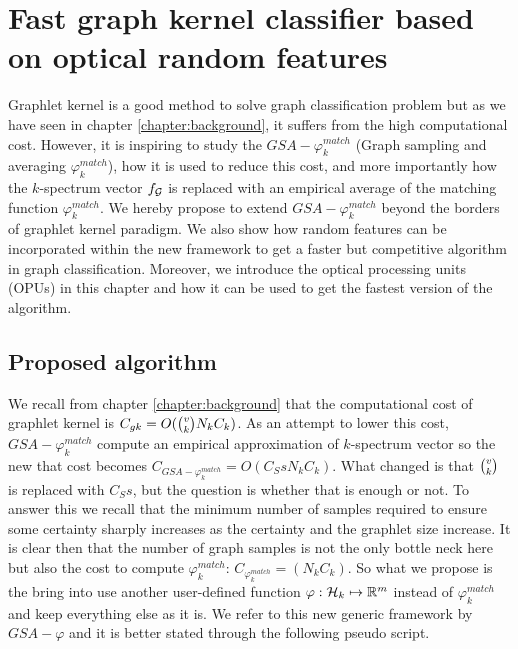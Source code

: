 \chapter{Fast graph kernel classifier based on optical random features }
\label{chapter:fast_algorithm}
Graphlet kernel  is a good method to solve graph classification problem but as we have seen in chapter \ref{chapter:background}, it suffers from the high computational cost. However, it is inspiring to study the $GSA-{\varphi_k^{match}}$ (Graph sampling and averaging $\varphi_k^{match}$), how it is used to reduce this cost, and more importantly how  the $k$-spectrum vector $f_{\mathcal{G}}$ is replaced with an empirical average of the matching function $\varphi_k^{match}$. We hereby propose to extend $GSA-{\varphi_k^{match}}$ beyond the borders of graphlet kernel paradigm. We also show how random features can be incorporated within the new framework to get a faster but  competitive algorithm in graph classification. Moreover, we introduce the optical processing units (OPUs) in this chapter and how it can be used to get the fastest version of the algorithm. 

\section{Proposed algorithm}
We recall from chapter \ref{chapter:background} that the computational cost of graphlet kernel is $C_{gk}= O(\tbinom{v}{k} N_k C_k)$. As an attempt to lower this cost, $GSA-\varphi_k^{match}$ compute an empirical approximation of $k$-spectrum vector so the new that cost becomes $C_{GSA-{\varphi_k^{match}}}= O(C_S s N_k C_k)$. What changed is that $\tbinom{v}{k}$ is replaced with $C_Ss$, but the question is whether that is enough or not. To answer this we recall that the minimum number of samples required to ensure some certainty sharply increases as the certainty and the graphlet size increase. It is clear then that the number of graph samples is not the only bottle neck here but also the cost to compute $\varphi_k^{match}$: $C_{\varphi_k^{match}}=(N_k C_k)$. So what we propose is the bring into use another user-defined function $\varphi:\mathcal{H}_k\mapsto\mathbb{R}^m$ instead of $\varphi_k^{match}$ and keep everything else as it is. We refer to this new generic framework by $GSA-\varphi$ and it is better stated through the following pseudo script.\newline 

